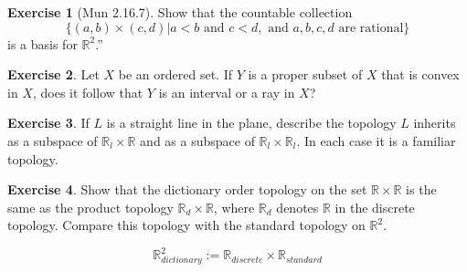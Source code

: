 \documentclass[
]{book}
\theoremstyle{definition}
\theoremstyle{definition}
\theoremstyle{definition}
\newtheorem{exercise}{Exercise}[chapter]
\theoremstyle{definition}
\theoremstyle{remark}
\begin{document}
\begin{exercise}[Mun 2.16.7]
\protect\hypertarget{exr:unnamed-chunk-91}{}\label{exr:unnamed-chunk-91}Show that the countable collection
\[\{(a, b) \times (c, d) | a < b \text{ and } c < d, \text{ and } a, b, c, d \text{ are rational}\}\]
is a basis for \(\mathbb{R}^2\).''
\end{exercise}

\begin{exercise}
\protect\hypertarget{exr:unnamed-chunk-92}{}\label{exr:unnamed-chunk-92}Let \(X\) be an ordered set. If \(Y\) is a proper subset of \(X\) that is convex in \(X\), does it follow that \(Y\) is an interval or a ray in \(X\)?
\end{exercise}

\begin{exercise}
\protect\hypertarget{exr:unnamed-chunk-93}{}\label{exr:unnamed-chunk-93}If \(L\) is a straight line in the plane, describe the topology \(L\) inherits as a subspace of \(\mathbb{R}_l \times \mathbb{R}\) and as a subspace of \(\mathbb{R}_l \times \mathbb{R}_l\). In each case it is a familiar topology.
\end{exercise}

\begin{exercise}
\protect\hypertarget{exr:unnamed-chunk-94}{}\label{exr:unnamed-chunk-94}Show that the dictionary order topology on the set \(\mathbb{R} \times \mathbb{R}\) is the same as the product topology \(\mathbb{R}_d \times \mathbb{R}\), where \(\mathbb{R}_d\) denotes \(\mathbb{R}\) in the discrete topology. Compare this topology with the standard topology on \(\mathbb{R}^2\).
\end{exercise}

\[\mathbb{R}^2_{dictionary}:=\mathbb{R}_{discrete }\times \mathbb{R}_{standard}\]
\end{document}
